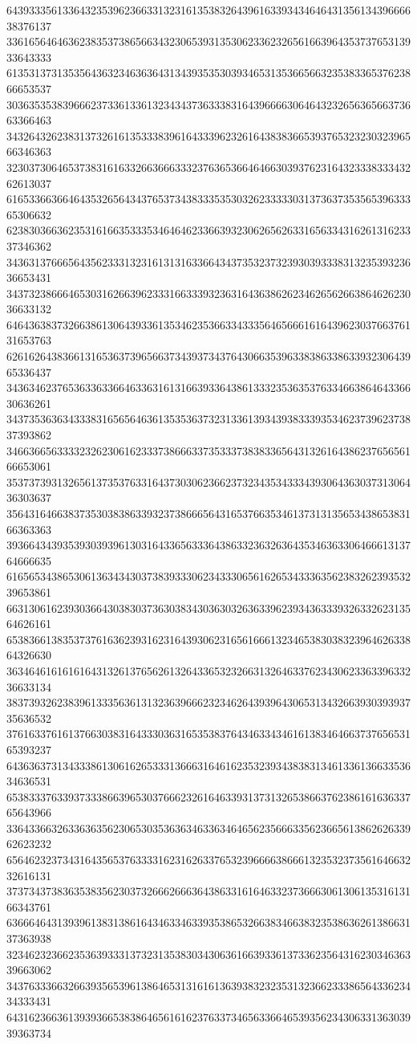 64393335613364323539623663313231613538326439616339343464643135613439666638376137
33616564646362383537386566343230653931353062336232656166396435373765313933643333
61353137313535643632346363643134393535303934653135366566323538336537623866653537
30363535383966623733613361323434373633383164396666306464323265636566373663366463
34326432623831373261613533383961643339623261643838366539376532323032396566346363
32303730646537383161633266366633323763653664646630393762316432333833343262613037
61653366366464353265643437653734383335353032623333303137363735356539633365306632
62383036636235316166353335346464623366393230626562633165633431626131623337346362
34363137666564356233313231613131633664343735323732393039333831323539323636653431
34373238666465303162663962333166333932363164363862623462656266386462623036633132
64643638373266386130643933613534623536633433356465666161643962303766376131653763
62616264383661316536373965663734393734376430663539633838633863393230643965336437
34363462376536336336646336316131663933643861333235363537633466386464336630636261
34373536363433383165656463613535363732313361393439383339353462373962373837393862
34663665633332326230616233373866633735333738383365643132616438623765656166653061
35373739313265613735376331643730306236623732343534333439306436303731306436303637
35643164663837353038386339323738666564316537663534613731313565343865383166363363
39366434393539303939613031643365633364386332363263643534636330646661313764666635
61656534386530613634343037383933306234333065616265343336356238326239353239653861
66313061623930366430383037363038343036303263633962393436333932633262313564626161
65383661383537376163623931623164393062316561666132346538303832396462633864326630
36346461616161643132613765626132643365323266313264633762343062336339633236633134
38373932623839613335636131323639666232346264393964306531343266393039393735636532
37616337616137663038316433303631653538376434633434616138346466373765653165393237
64363637313433386130616265333136663164616235323934383831346133613663353634636531
65383337633937333866396530376662326164633931373132653866376238616163633765643966
33643366326336363562306530353636346336346465623566633562366561386262633962623232
65646232373431643565376333316231626337653239666638666132353237356164663232616131
37373437383635383562303732666266636438633161646332373666306130613531613166343761
63666464313939613831386164346334633935386532663834663832353863626138663137363938
32346232366235363933313732313538303430636166393361373362356431623034636339663062
34376333663266393565396138646531316161363938323235313236623338656433623434333431
64316236636139393665383864656161623763373465633664653935623430633136303939363734
